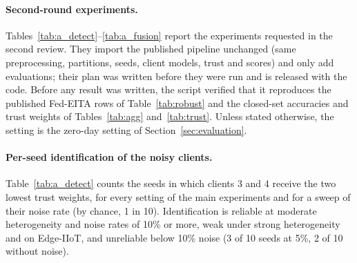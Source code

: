 \documentclass[pdflatex,sn-mathphys-num]{sn-jnl}
\newcommand{\Rtwo}{\color{blue}}
\begin{document}
{{{{{{\Rtwo
\paragraph{Second-round experiments.} Tables~\ref{tab:a_detect}--\ref{tab:a_fusion} report the experiments requested in the second review. They import the published pipeline unchanged (same preprocessing, partitions, seeds, client models, trust and scores) and only add evaluations; their plan was written before they were run and is released with the code. Before any result was written, the script verified that it reproduces the published Fed-EITA rows of Table~\ref{tab:robust} and the closed-set accuracies and trust weights of Tables~\ref{tab:agg} and~\ref{tab:trust}. Unless stated otherwise, the setting is the zero-day setting of Section~\ref{sec:evaluation}.

\paragraph{Per-seed identification of the noisy clients.} Table~\ref{tab:a_detect} counts the seeds in which clients 3 and 4 receive the two lowest trust weights, for every setting of the main experiments and for a sweep of their noise rate (by chance, 1 in 10). Identification is reliable at moderate heterogeneity and noise rates of 10\% or more, weak under strong heterogeneity and on Edge-IIoT, and unreliable below 10\% noise (3 of 10 seeds at 5\%, 2 of 10 without noise).

}}}}}}
\end{document}
